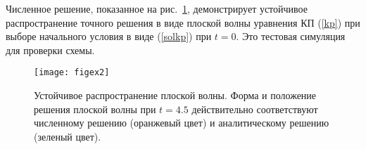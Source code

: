 Численное решение, показанное на рис.~\ref{figex2}, демонстрирует устойчивое распространение точного решения в виде плоской волны уравнения КП (\ref {kp}) при выборе начального условия в виде (\ref{solkp}) при $t = 0$. Это тестовая симуляция для проверки схемы.

\begin{figure}
	\centering
	\texttt{[image: figex2]}
	\caption{Устойчивое распространение плоской волны. Форма и положение решения плоской волны при $ t = 4.5 $ действительно соответствуют численному решению (оранжевый цвет) и аналитическому решению (зеленый цвет).}\label{figex2}	
\end{figure}

